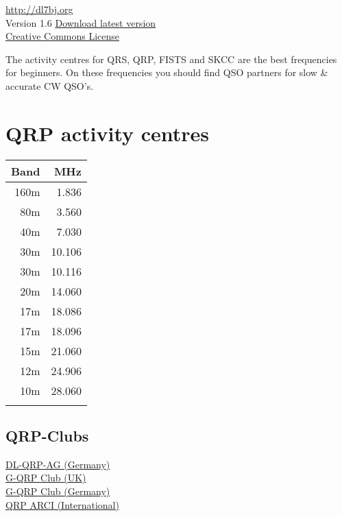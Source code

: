 \documentclass[10pt]{article}
\begin{document}
\begin{multicols}{3}
\vspace{1cm}
\noindent \thedate{} \theauthor{} \href{http://dl7bj.org}{http://dl7bj.org} \\
Version 1.6 \href{https://github.com/DL7BJ/CW-Refcard/raw/master/cw-refcard.pdf}{Download latest version}\\
\ccbyncsa \hspace{0.5cm} \href{http://creativecommons.org/licenses/by-nc-sa/4.0}{Creative Commons License} \\

\newpage

The activity centres for QRS, QRP, FISTS and SKCC are the best frequencies for beginners.
On these frequencies you should find QSO partners for slow \& accurate CW QSO's.

\section{QRP activity centres}
\vspace{\baselineskip}
\begin{tabular}{rr}
Band & MHz\\ \hline 
160m & 1.836\\
 80m & 3.560\\
 40m & 7.030\\
 30m & 10.106\\
 30m & 10.116\\
 20m & 14.060\\
 17m & 18.086\\
 17m & 18.096\\
 15m & 21.060\\
 12m & 24.906\\
 10m & 28.060\\
     &       \\
\end{tabular}

\subsection{QRP-Clubs}
\href{http://www.dl-qrp-ag.de}{DL-QRP-AG (Germany)}\\
\href{http://www.gqrp.com}{G-QRP Club (UK)}\\
\href{http://www.g-qrp-dl.de}{G-QRP Club (Germany)}\\
\href{http://www.qrparci.org}{QRP ARCI (International)}\\


\end{multicols}
\end{document}
